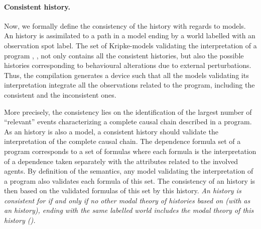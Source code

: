 \documentclass{eptcs}
\newcommand{\ie}[0]{\abbrev{\textit{i.e.}}}
\newcounter{ti}
\begin{document}
\paragraph{Consistent history.} Now, we formally define the consistency of the history with regards to models. 
An history is assimilated to a path in a model ending by a world labelled with an observation spot label. 
The set of Kripke-models validating the interpretation of a program , , not only contains all the consistent histories, but also the possible histories corresponding to behavioural alterations due to external perturbations. Thus, the compilation generates a device such that all the models validating its interpretation integrate all the observations related to the program, including the consistent and the inconsistent ones.

More precisely, the consistency lies on the identification of the largest number of ``relevant'' events characterizing a complete causal chain described in a program. As an history is also a model, a consistent history should validate the interpretation of the complete causal chain.
 The dependence formula set  of a program  corresponds to a set of formulas where each formula is the interpretation of a dependence taken separately with the attributes related to the involved agents.
 By definition of the semantics, any model validating the interpretation of a program also validates each formula of this set. The consistency of an history is then based on the validated formulas of this set by this history. \emph{An history  is consistent for  if and only if no other modal theory of histories based on  (\ie  with  as an history), ending with the same labelled world includes the modal theory of this history (\ie ).}
\end{document}
